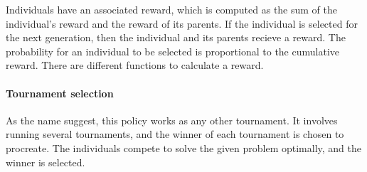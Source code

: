 Individuals have an associated reward, which is computed as the sum of the individual's reward and the reward of its parents. If the individual is selected for the next generation, then the individual and its parents recieve a reward. The probability for an individual to be selected is proportional to the cumulative reward. There are different functions to calculate a reward\cite{loshchilov2011not}.

\paragraph{Tournament selection}

As the name suggest, this policy works as any other tournament. It involves running several tournaments, and the winner of each tournament is chosen to procreate. The individuals compete to solve the given problem optimally, and the winner is selected\cite{miller1996genetic}.

